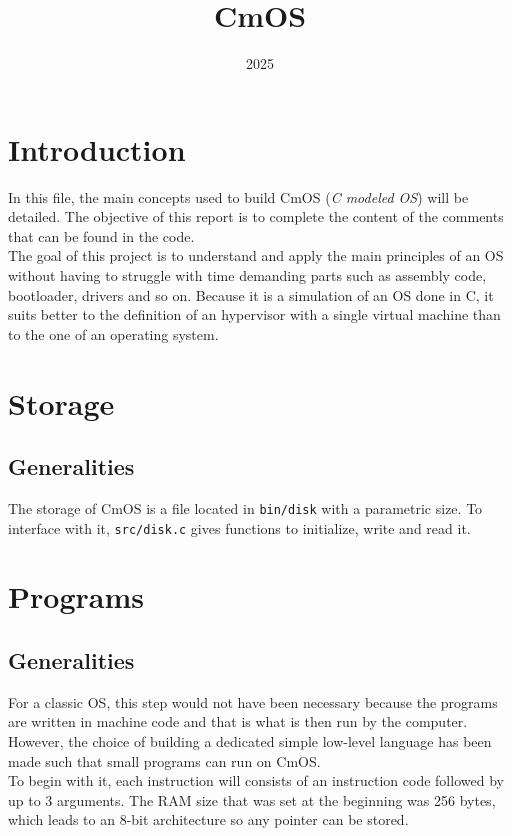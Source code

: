 \documentclass[a4paper,12pt]{article}
\title{CmOS}
\date{2025}
\begin{document}
\maketitle


\section{Introduction}

In this file, the main concepts used to build CmOS (\textit{C modeled OS}) will be detailed. The objective of this report is to complete the content of the comments that can be found in the code.\\
The goal of this project is to understand and apply the main principles of an OS without having to struggle with time demanding parts such as assembly code, bootloader, drivers and so on. Because it is a simulation of an OS done in C, it suits better to the definition of an hypervisor with a single virtual machine than to the one of an operating system.

\section{Storage}

\subsection{Generalities}

The storage of CmOS is a file located in \texttt{bin/disk} with a parametric size. To interface with it, \texttt{src/disk.c} gives functions to initialize, write and read it.

\section{Programs}

\subsection{Generalities}

For a classic OS, this step would not have been necessary because the programs are written in machine code and that is what is then run by the computer. However, the choice of building a dedicated simple low-level language has been made such that small programs can run on CmOS.\\
To begin with it, each instruction will consists of an instruction code followed by up to 3 arguments. The RAM size that was set at the beginning was 256 bytes, which leads to an 8-bit architecture so any pointer can be stored.
\end{document}
